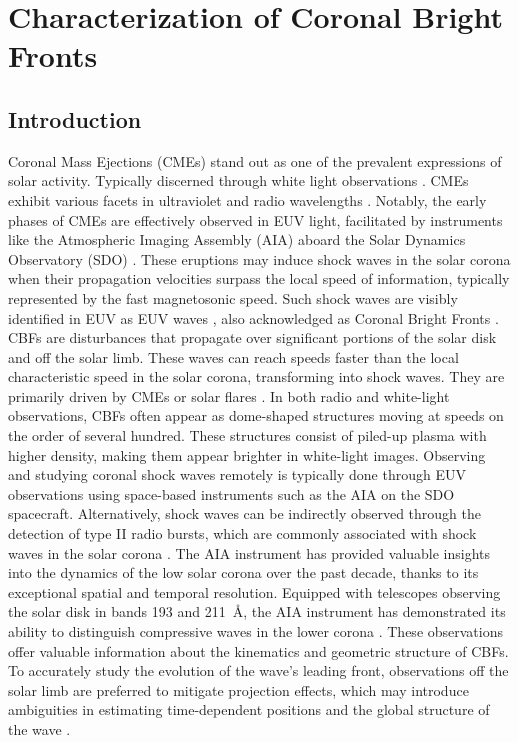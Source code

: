 \chapter{Characterization of Coronal Bright Fronts}
\label{chapter2}



\section{Introduction}
Coronal Mass Ejections (CMEs) stand out as one of the prevalent expressions of solar activity. Typically discerned through white light observations \citep{vourlidas_2003, zhang_2006, bein_2011}. CMEs exhibit various facets in ultraviolet and radio wavelengths \citep{bastian_2001, veronig_2010}. Notably, the early phases of CMEs are effectively observed in EUV light, facilitated by instruments like the Atmospheric Imaging Assembly (AIA) aboard the Solar Dynamics Observatory (SDO) \citep{lemen_2011, pesnell_2012}. These eruptions may induce shock waves in the solar corona when their propagation velocities surpass the local speed of information, typically represented by the fast magnetosonic speed. Such shock waves are visibly identified in EUV as EUV waves \citep{thompson_1998}, also acknowledged as Coronal Bright Fronts \citep[CBFs]{long_2011}.
CBFs are disturbances that propagate over significant portions of the solar disk and off the solar limb. These waves can reach speeds faster than the local characteristic speed in the solar corona, transforming into shock waves. They are primarily driven by CMEs or solar flares \citep{thompson_1998, veronig_2010, vrsnak_2008, magdaleni_2010, nindos_2011}. In both radio and white-light observations, CBFs often appear as dome-shaped structures moving at speeds on the order of several hundred\kms \citep{pick_2006, nindos_2008, thompson_2009}. These structures consist of piled-up plasma with higher density, making them appear brighter in white-light images.
Observing and studying coronal shock waves remotely is typically done through EUV observations using space-based instruments such as the AIA on the SDO spacecraft. Alternatively, shock waves can be indirectly observed through the detection of type II radio bursts, which are commonly associated with shock waves in the solar corona \citep{vrsnak_2008}.
The AIA instrument has provided valuable insights into the dynamics of the low solar corona over the past decade, thanks to its exceptional spatial and temporal resolution. Equipped with telescopes observing the solar disk in bands 193 and 211~\AA, the AIA instrument has demonstrated its ability to distinguish compressive waves in the lower corona \citep{patsourakos_2010, ma_2011, kozarev_2011}. These observations offer valuable information about the kinematics and geometric structure of CBFs. To accurately study the evolution of the wave's leading front, observations off the solar limb are preferred to mitigate projection effects, which may introduce ambiguities in estimating time-dependent positions and the global structure of the wave \citep{kozarev_2015}.
